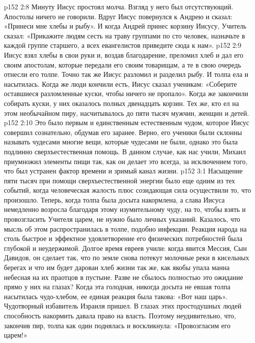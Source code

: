 \vs p152 2:8 Минуту Иисус простоял молча. Взгляд у него был отсутствующий. Апостолы ничего не говорили. Вдруг Иисус повернулся к Андрею и сказал: «Принеси мне хлебы и рыбу». И когда Андрей принес корзину Иисусу, Учитель сказал: «Прикажите людям сесть на траву группами по сто человек, назначьте в каждой группе старшего, а всех евангелистов приведите сюда к нам».
\vs p152 2:9 Иисус взял хлебы в свои руки и, воздав благодарение, преломил хлеб и дал его своим апостолам, которые передали его своим товарищам, а те в свою очередь отнесли его толпе. Точно так же Иисус разломил и разделил рыбу. И толпа ела и насытилась. Когда же люди кончили есть, Иисус сказал ученикам: «Соберите оставшиеся разломленные куски, чтобы ничего не пропало». Когда же закончили собирать куски, у них оказалось полных двенадцать корзин. Тех же, кто ел на этом необычайном пиру, насчитывалось до пяти тысяч мужчин, женщин и детей.
\vs p152 2:10 \pc Это было первым и единственным естественным чудом, которое Иисус совершил сознательно, обдумав его заранее. Верно, его ученики были склонны называть чудесами многие вещи, которые чудесами не были, однако это была подлинно сверхъестественная помощь. В данном случае, как нас учили, Михаил приумножил элементы пищи так, как он делает это всегда, за исключением того, что был устранен фактор времени и зримый канал жизни.
\vs p152 3:1 Насыщение пяти тысяч при помощи сверхъестественной энергии было еще одним из тех событий, когда человеческая жалость плюс созидающая сила осуществили то, что произошло. Теперь, когда толпа была досыта накормлена, а слава Иисуса немедленно возросла благодаря этому изумительному чуду, на то, чтобы взять и провозгласить Учителя царем, не нужно было личных указаний. Казалось, что мысль об этом распространилась в толпе, подобно инфекции. Реакция народа на столь быстрое и эффектное удовлетворение его физических потребностей была глубокой и неудержимой. Долгое время евреев учили: когда явится Мессия, Сын Давидов, он сделает так, что по земле снова потекут молочные реки в кисельных берегах и что им будет дарован хлеб жизни так же, как якобы упала манна небесная на их праотцов в пустыне. Разве не сбылось полностью это ожидание прямо у них на глазах? Когда эта голодная, никогда досыта не евшая толпа насытилась чудо\hyp{}хлебом, ее единая реакция была такова: «Вот наш царь». Чудотворный избавитель Израиля пришел. В глазах этих простодушных людей способность накормить давала право на власть. Поэтому неудивительно, что, закончив пир, толпа как один поднялась и воскликнула: «Провозгласим его царем!»
